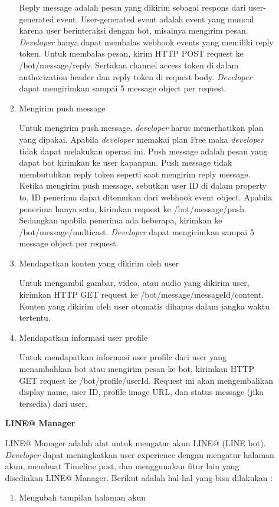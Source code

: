 \documentclass[a4paper,twoside]{article}
\begin{document}
\begin{enumerate}
\begin{enumerate}
\begin{enumerate}
Reply message adalah pesan yang dikirim sebagai respons dari user-generated event. User-generated event adalah event yang muncul karena user berinteraksi dengan bot, misalnya mengirim pesan. \textit{Developer} hanya dapat membalas webhook events yang memiliki reply token.
Untuk membalas pesan, kirim HTTP POST request ke /bot/message/reply. Sertakan channel access token di dalam authorization header dan reply token di request body. \textit{Developer} dapat mengirimkan sampai 5 message object per request.

\item Mengirim push message

Untuk mengirim push message, \textit{developer} harus memerhatikan plan yang dipakai. Apabila \textit{developer} memakai plan Free maka \textit{developer} tidak dapat melakukan operasi ini. Push message adalah pesan yang dapat bot kirimkan ke user kapanpun. Push message tidak membutuhkan reply token seperti saat mengirim reply message. Ketika mengirim push message, sebutkan user ID di dalam property to. ID penerima dapat ditemukan dari webhook event object. Apabila penerima hanya satu, kirimkan request ke /bot/message/push. Sedangkan apabila penerima ada beberapa, kirimkan ke /bot/message/multicast. \textit{Developer} dapat mengirimkan sampai 5 message object per request.

\item Mendapatkan konten yang dikirim oleh user

Untuk mengambil gambar, video, atau audio yang dikirim user, kirimkan HTTP GET request ke /bot/message/{messageId}/content. Konten yang dikirim oleh user otomatis dihapus dalam jangka waktu tertentu.

\item Mendapatkan informasi user profile

Untuk mendapatkan informasi user profile dari user yang menambahkan bot atau mengirim pesan ke bot, kirimkan HTTP GET request ke /bot/profile/{userId}. Request ini akan mengembalikan display name, user ID, profile image URL, dan status message (jika tersedia) dari user.
\end{enumerate}

\textbf{LINE@ Manager}

LINE@ Manager adalah alat untuk mengatur akun LINE@ (LINE bot). \textit{Developer} dapat meningkatkan user experience dengan mengatur halaman akun, membuat Timeline post, dan menggunakan fitur lain yang disediakan LINE@ Manager. Berikut adalah hal-hal yang bisa dilakukan :
\begin{enumerate}
\item Mengubah tampilan halaman akun


\end{enumerate}
\end{enumerate}
\end{enumerate}
\end{document}
